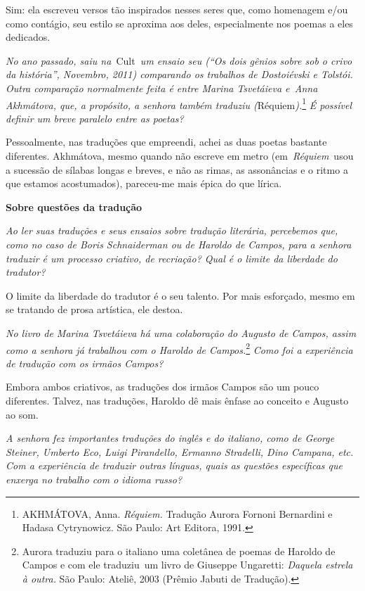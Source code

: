 Sim: ela escreveu versos tão inspirados nesses seres que, como homenagem
e/ou como contágio, seu estilo se aproxima aos deles, especialmente nos
poemas a eles dedicados.

\emph{No ano passado, saiu na~}Cult\emph{~um ensaio seu (``Os dois
gênios sobre sob o crivo da história'', Novembro, 2011) comparando os
trabalhos de Dostoiévski e Tolstói. Outra comparação normalmente feita é
entre Marina Tsvetáieva e~Anna Akhmátova, que, a propósito, a senhora
também traduziu (}Réquiem\emph{).}\footnote{AKHMÁTOVA, Anna.
  \emph{Réquiem.} Tradução Aurora Fornoni Bernardini e Hadasa
  Cytrynowicz. São Paulo: Art Editora, 1991.} \emph{É possível definir
um breve paralelo entre as poetas?}

Pessoalmente, nas traduções que empreendi, achei as duas poetas bastante
diferentes. Akhmátova, mesmo quando não escreve em metro
(em~\emph{Réquiem}~usou a sucessão de sílabas longas e breves, e não as
rimas, as assonâncias e o ritmo a que estamos acostumados), pareceu-me
mais épica do que lírica.

\textbf{Sobre questões da tradução}

\emph{Ao ler suas traduções e seus ensaios sobre tradução literária,
percebemos que, como no caso de Boris Schnaiderman ou de Haroldo de
Campos, para a senhora traduzir é um processo criativo, de recriação?
Qual é o limite da liberdade do tradutor?}

O limite da liberdade do tradutor é o seu talento. Por mais esforçado,
mesmo em se tratando de prosa artística, ele destoa.

\emph{No livro de Marina Tsvetáieva há uma colaboração do Augusto de
Campos, assim como a senhora já trabalhou com o Haroldo de
Campos.}\footnote{Aurora traduziu para o italiano uma coletânea de
  poemas de Haroldo de Campos e com ele traduziu~um livro de Giuseppe
  Ungaretti: \emph{Daquela estrela à outra.} São Paulo: Ateliê, 2003
  (Prêmio Jabuti de Tradução).} \emph{Como foi a experiência de tradução
com os irmãos Campos?}

Embora ambos criativos, as traduções dos irmãos Campos são um pouco
diferentes. Talvez, nas traduções, Haroldo dê mais ênfase ao conceito e
Augusto ao som.~

\emph{A senhora fez importantes traduções do inglês e do italiano, como
de George Steiner, Umberto Eco, Luigi Pirandello, Ermanno Stradelli,
Dino Campana, etc. Com a experiência de traduzir outras línguas, quais
as questões específicas que enxerga no trabalho com o idioma russo?}

